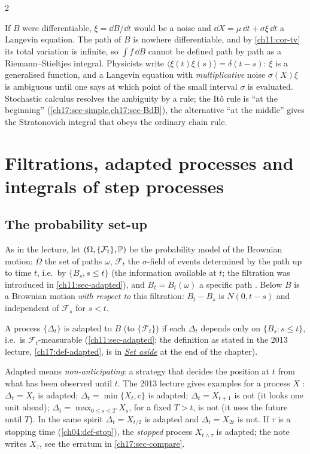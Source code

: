 \begin{paracol}{2}
\begin{intuition}
If $B$ were differentiable, $\xi=\dd B/\dd t$ would be a noise and $\dd X=\mu\,\dd t+\sigma\xi\,\dd t$ a Langevin equation. The path of $B$
is nowhere differentiable, and by \cref{ch11:cor-tv} its total variation is infinite, so $\int f\,\dd B$ cannot be defined path by
path as a Riemann--Stieltjes integral. Physicists write $\langle\xi(t)\xi(s)\rangle=\delta(t-s)$: $\xi$ is a generalised function, and a
Langevin equation with \emph{multiplicative} noise $\sigma(X)\xi$ is ambiguous until one says at which point of
the small interval $\sigma$ is evaluated. Stochastic calculus resolves the ambiguity by a rule; the It\^o rule is
``at the beginning'' (\cref{ch17:sec-simple,ch17:sec-BdB}), the alternative ``at the middle'' gives the Stratonovich integral
that obeys the ordinary chain rule.
\end{intuition}

\section{Filtrations, adapted processes and integrals of step processes}\label{ch17:sec-simple}

\subsection{The probability set-up}\label{ch17:sec-setup}
As in the lecture, let $(\Omega,\{\mathcal F_t\},\mathbb{P})$ be the probability model of the Brownian motion: $\Omega$ the set of
paths $\omega$, $\mathcal F_t$ the $\sigma$-field of events determined by the path up to time $t$, i.e.\ by $\{B_s,s\le t\}$
(the information available at $t$; the filtration was introduced in \cref{ch11:sec-adapted}), and $B_t=B_t(\omega)$ a
specific path . Below $B$ is a Brownian motion
\emph{with respect to} this filtration: $B_t-B_s$ is $N(0,t-s)$ and independent of $\mathcal F_s$ for $s<t$.

\begin{recall}
A process $\{\Delta_t\}$ is adapted to $B$ (to $\{\mathcal F_t\}$) if each $\Delta_t$ depends only on $\{B_s:s\le t\}$, i.e.\ is $\mathcal F_t$-measurable (\cref{ch11:sec-adapted}; the definition as stated in the 2013 lecture, \cref{ch17:def-adapted}, is in \hyperref[ch17:sec-setaside]{\emph{Set aside}} at the end of the chapter).
\end{recall}
Adapted means \emph{non-anticipating}: a strategy that decides the position at $t$ from what has been observed until $t$.
The 2013 lecture gives examples for a process $X$ : $\Delta_t=X_t$ is adapted;
$\Delta_t=\min\{X_t,c\}$ is adapted; $\Delta_t=X_{t+1}$ is not (it looks one unit ahead); $\Delta_t=\max_{0\le s\le T}X_s$, for a fixed
$T>t$, is not (it uses the future until $T$). In the same spirit $\Delta_t=X_{t/2}$ is adapted and $\Delta_t=X_{2t}$ is not. If $\tau$ is a stopping time (\cref{ch04:def-stop}),
the \emph{stopped} process $X_{t\wedge\tau}$ is adapted; the note writes $X_\tau$, see the erratum in \cref{ch17:sec-compare}.


\end{paracol}
